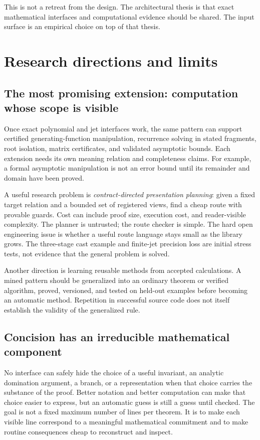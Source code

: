 \documentclass[11pt,letterpaper]{article}
\numberwithin{equation}{section}
\begin{document}
This is not a retreat from the design. The architectural thesis is that exact
mathematical interfaces and computational evidence should be shared. The input
surface is an empirical choice on top of that thesis.

\section{Research directions and limits}\label{sec:limits}
\subsection{The most promising extension: computation whose scope is visible}
Once exact polynomial and jet interfaces work, the same pattern can support
certified generating-function manipulation, recurrence solving in stated
fragments, root isolation, matrix certificates, and validated asymptotic bounds.
Each extension needs its own meaning relation and completeness claims. For
example, a formal asymptotic manipulation is not an error bound until its
remainder and domain have been proved.

A useful research problem is \emph{contract-directed presentation planning}:
given a fixed target relation and a bounded set of registered views, find a cheap
route with provable guards. Cost can include proof size, execution cost, and
reader-visible complexity. The planner is untrusted; the route checker is
simple. The hard open engineering issue is whether a useful route language stays
small as the library grows. The three-stage cast example and finite-jet precision
loss are initial stress tests, not evidence that the general problem is solved.

Another direction is learning reusable methods from accepted calculations.
A mined pattern should be generalized into an ordinary theorem or verified
algorithm, proved, versioned, and tested on held-out examples before becoming an
automatic method. Repetition in successful source code does not itself establish
the validity of the generalized rule.

\subsection{Concision has an irreducible mathematical component}
No interface can safely hide the choice of a useful invariant, an analytic
domination argument, a branch, or a representation when that choice carries the
substance of the proof. Better notation and better computation can make that
choice easier to express, but an automatic guess is still a guess until checked.
The goal is not a fixed maximum number of lines per theorem. It is to make each
visible line correspond to a meaningful mathematical commitment and to make
routine consequences cheap to reconstruct and inspect.
\end{document}
